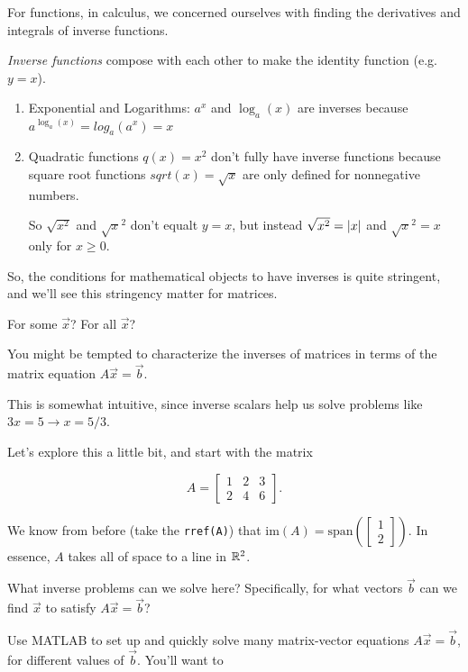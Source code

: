 \documentclass{ximera}
\begin{document}
\begin{example}

  For functions, in calculus, we concerned ourselves with finding the derivatives and integrals of inverse functions.

  \emph{Inverse functions} compose with each other to make the identity function (e.g. $y=x$). 

  \begin{enumerate}
  
    \item Exponential and Logarithms: $a^x$ and $\log_a(x)$ are inverses because $a^{\log_a(x)}=log_a(a^x)=x$
    
    \item Quadratic functions $q(x)=x^2$ don't fully have inverse functions because square root functions $sqrt(x)=\sqrt{x}$ are only defined for nonnegative numbers.
    
    So $\sqrt{x^2}$ and $\sqrt{x}^2$ don't equalt $y=x$, but instead $\sqrt{x^2}=\left|x\right|$ and $\sqrt{x}^2=x$ only for $x\geq 0$.

  \end{enumerate}

\end{example}

So, the conditions for mathematical objects to have inverses is quite stringent, and we'll see this stringency matter for matrices. 

\begin{exploration}{For some $\vec{x}$? For all $\vec{x}$?}

  You might be tempted to characterize the inverses of matrices in terms of the matrix equation $A\vec{x}=\vec{b}$. 
  
  This is somewhat intuitive, since inverse scalars help us solve problems like $3x=5\rightarrow x=5/3$. 

  Let's explore this a little bit, and start with the matrix 

  $$A=\begin{bmatrix}1&2&3\\2&4&6\end{bmatrix}.$$

  We know from before (take the \texttt{rref(A)}) that $\mbox{im}(A)=\mbox{span}\left(\begin{bmatrix}1\\2\end{bmatrix}\right)$. In essence, $A$ takes all of space to a line in $\mathbb{R}^2$.

  What inverse problems can we solve here? Specifically, for what vectors $\vec{b}$ can we find $\vec{x}$ to satisfy $A\vec{x}=\vec{b}$?

  Use MATLAB to set up and quickly solve many matrix-vector equations $A\vec{x}=\vec{b}$, for different values of $\vec{b}$. You'll want to 



\end{exploration}
\end{document}
